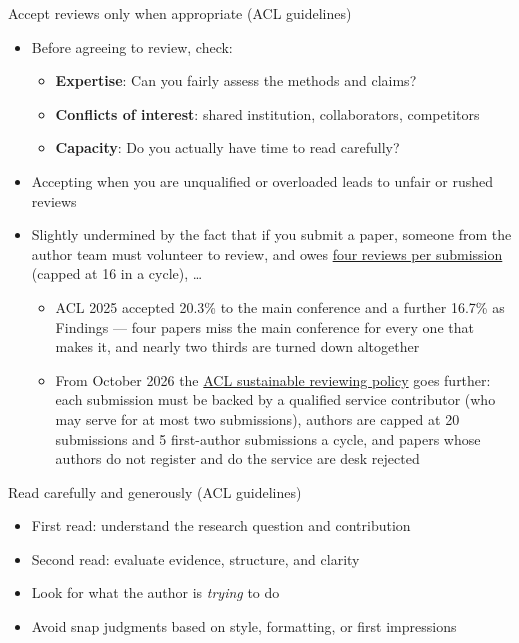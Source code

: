 \documentclass[aspectratio=169]{beamer}
\begin{document}
\begin{frame}{Accept reviews only when appropriate (ACL guidelines)}
\begin{itemize}
  \item Before agreeing to review, check:
    \begin{itemize}
      \item \textbf{Expertise}: Can you fairly assess the methods and claims?
      \item \textbf{Conflicts of interest}: shared institution, collaborators, competitors
      \item \textbf{Capacity}: Do you actually have time to read carefully?
    \end{itemize}
  \item Accepting when you are unqualified or overloaded leads to unfair or rushed reviews
  \item Slightly undermined by the fact that if you submit a paper, someone from the author team must volunteer to review, and owes
        \href{https://aclrollingreview.org/reviewing-workload-adjustment/}{four reviews per submission} (capped at 16 in a cycle), \ldots
      \begin{itemize}
    \item ACL 2025 accepted 20.3\% to the main conference and a further 16.7\% as Findings --- four papers miss the main conference for every one that makes it, and nearly two thirds are turned down altogether
    \item From October 2026 the \href{https://aclrollingreview.org/sustainable-reviewing-2026}{ACL sustainable reviewing policy} goes further: each submission must be backed by a qualified service contributor (who may serve for at most two submissions), authors are capped at 20 submissions and 5 first-author submissions a cycle, and papers whose authors do not register and do the service are desk rejected
    \end{itemize}
\end{itemize}

\end{frame}


\begin{frame}{Read carefully and generously (ACL guidelines)}
\begin{itemize}
  \item First read: understand the research question and contribution
  \item Second read: evaluate evidence, structure, and clarity
  \item Look for what the author is \emph{trying} to do
  \item Avoid snap judgments based on style, formatting, or first impressions
\end{itemize}

\end{frame}
\end{document}
